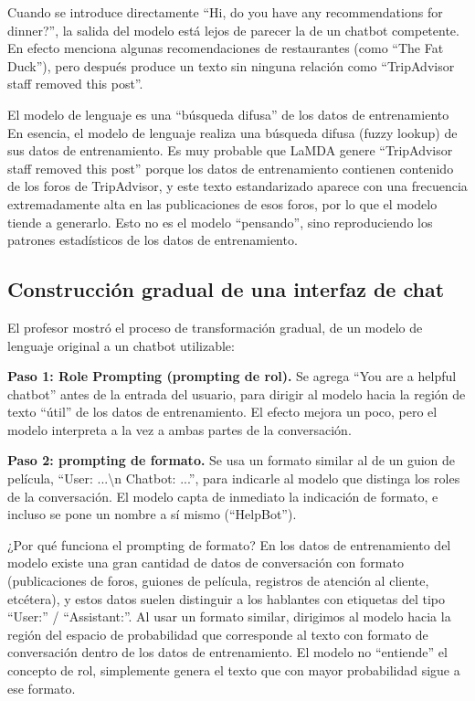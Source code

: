 \documentclass[a4paper]{article}
\begin{document}
Cuando se introduce directamente ``Hi, do you have any recommendations for dinner?'', la salida del modelo está lejos de parecer la de un chatbot competente. En efecto menciona algunas recomendaciones de restaurantes (como ``The Fat Duck''), pero después produce un texto sin ninguna relación como ``TripAdvisor staff removed this post''.

\begin{importantbox}{El modelo de lenguaje es una ``búsqueda difusa'' de los datos de entrenamiento}
En esencia, el modelo de lenguaje realiza una búsqueda difusa (fuzzy lookup) de sus datos de entrenamiento. Es muy probable que LaMDA genere ``TripAdvisor staff removed this post'' porque los datos de entrenamiento contienen contenido de los foros de TripAdvisor, y este texto estandarizado aparece con una frecuencia extremadamente alta en las publicaciones de esos foros, por lo que el modelo tiende a generarlo. Esto no es el modelo ``pensando'', sino reproduciendo los patrones estadísticos de los datos de entrenamiento.
\end{importantbox}

\subsection{Construcción gradual de una interfaz de chat}

El profesor mostró el proceso de transformación gradual, de un modelo de lenguaje original a un chatbot utilizable:

\textbf{Paso 1: Role Prompting (prompting de rol).} Se agrega ``You are a helpful chatbot'' antes de la entrada del usuario, para dirigir al modelo hacia la región de texto ``útil'' de los datos de entrenamiento. El efecto mejora un poco, pero el modelo interpreta a la vez a ambas partes de la conversación.

\textbf{Paso 2: prompting de formato.} Se usa un formato similar al de un guion de película, ``User: ...\textbackslash n Chatbot: ...'', para indicarle al modelo que distinga los roles de la conversación. El modelo capta de inmediato la indicación de formato, e incluso se pone un nombre a sí mismo (``HelpBot'').

\begin{knowledgebox}{¿Por qué funciona el prompting de formato?}
En los datos de entrenamiento del modelo existe una gran cantidad de datos de conversación con formato (publicaciones de foros, guiones de película, registros de atención al cliente, etcétera), y estos datos suelen distinguir a los hablantes con etiquetas del tipo ``User:'' / ``Assistant:''. Al usar un formato similar, dirigimos al modelo hacia la región del espacio de probabilidad que corresponde al texto con formato de conversación dentro de los datos de entrenamiento. El modelo no ``entiende'' el concepto de rol, simplemente genera el texto que con mayor probabilidad sigue a ese formato.
\end{knowledgebox}
\end{document}
